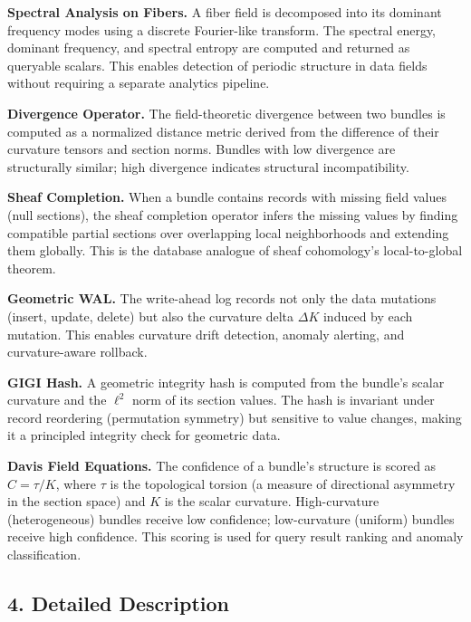 \documentclass[11pt,letterpaper]{article}
\begin{document}
\textbf{Spectral Analysis on Fibers.} A fiber field is decomposed into its dominant frequency modes using a discrete Fourier-like transform. The spectral energy, dominant frequency, and spectral entropy are computed and returned as queryable scalars. This enables detection of periodic structure in data fields without requiring a separate analytics pipeline.

\textbf{Divergence Operator.} The field-theoretic divergence between two bundles is computed as a normalized distance metric derived from the difference of their curvature tensors and section norms. Bundles with low divergence are structurally similar; high divergence indicates structural incompatibility.

\textbf{Sheaf Completion.} When a bundle contains records with missing field values (null sections), the sheaf completion operator infers the missing values by finding compatible partial sections over overlapping local neighborhoods and extending them globally. This is the database analogue of sheaf cohomology's local-to-global theorem.

\textbf{Geometric WAL.} The write-ahead log records not only the data mutations (insert, update, delete) but also the curvature delta $\Delta K$ induced by each mutation. This enables curvature drift detection, anomaly alerting, and curvature-aware rollback.

\textbf{GIGI Hash.} A geometric integrity hash is computed from the bundle's scalar curvature and the $\ell^2$ norm of its section values. The hash is invariant under record reordering (permutation symmetry) but sensitive to value changes, making it a principled integrity check for geometric data.

\textbf{Davis Field Equations.} The confidence of a bundle's structure is scored as $C = \tau / K$, where $\tau$ is the topological torsion (a measure of directional asymmetry in the section space) and $K$ is the scalar curvature. High-curvature (heterogeneous) bundles receive low confidence; low-curvature (uniform) bundles receive high confidence. This scoring is used for query result ranking and anomaly classification.


\subsection*{4. Detailed Description}
\end{document}
